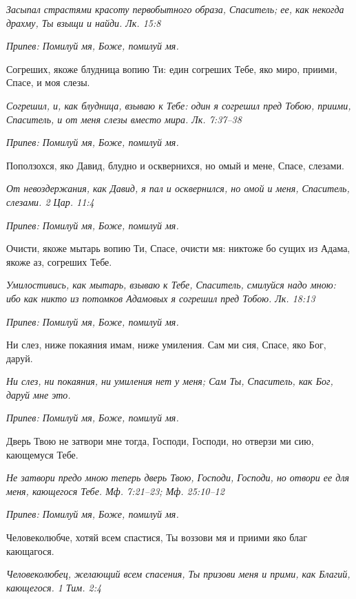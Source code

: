 \itshape Засыпал страстями красоту первобытного образа, Спаситель; ее, как некогда драхму, Ты взыщи и найди. Лк. 15:8\normalfont{}


\itshape Припев:\normalfont{} Помилуй мя, Боже, помилуй мя.


Согреших, якоже блудница вопию Ти: един согреших Тебе, яко миро, приими, Спасе, и моя слезы.


\itshape Согрешил, и, как блудница, взываю к Тебе: один я согрешил пред Тобою, приими, Спаситель, и от меня слезы вместо мира. Лк. 7:37–38\normalfont{}


\itshape Припев:\normalfont{} Помилуй мя, Боже, помилуй мя.


Поползохся, яко Давид, блудно и осквернихся, но омый и мене, Спасе, слезами.


\itshape От невоздержания, как Давид, я пал и осквернился, но омой и меня, Спаситель, слезами. 2 Цар. 11:4\normalfont{}


\itshape Припев:\normalfont{} Помилуй мя, Боже, помилуй мя.


Очисти, якоже мытарь вопию Ти, Спасе, очисти мя: никтоже бо сущих из Адама, якоже аз, согреших Тебе.


\itshape Умилостивись, как мытарь, взываю к Тебе, Спаситель, смилуйся надо мною: ибо как никто из потомков Адамовых я согрешил пред Тобою. Лк. 18:13\normalfont{}


\itshape Припев:\normalfont{} Помилуй мя, Боже, помилуй мя.


Ни слез, ниже покаяния имам, ниже умиления. Сам ми сия, Спасе, яко Бог, даруй.


\itshape Ни слез, ни покаяния, ни умиления нет у меня; Сам Ты, Спаситель, как Бог, даруй мне это.\normalfont{}


\itshape Припев:\normalfont{} Помилуй мя, Боже, помилуй мя.


Дверь Твою не затвори мне тогда, Господи, Господи, но отверзи ми сию, кающемуся Тебе.


\itshape Не затвори предо мною теперь дверь Твою, Господи, Господи, но отвори ее для меня, кающегося Тебе. Мф. 7:21–23; Мф. 25:10–12\normalfont{}


\itshape Припев:\normalfont{} Помилуй мя, Боже, помилуй мя.


Человеколюбче, хотяй всем спастися, Ты воззови мя и приими яко благ кающагося.


\itshape Человеколюбец, желающий всем спасения, Ты призови меня и прими, как Благий, кающегося. 1 Тим. 2:4\normalfont{}


